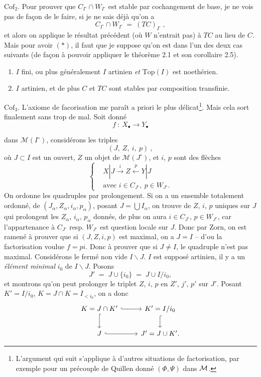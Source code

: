 $\mathrm{Cof}_2$. Pour prouver que $C_{I^\circ} \cap W_{I^\circ}$ est stable par cochangement de base, je ne vois pas de façon de le faire, si je ne sais déjà qu'on a
\[ C_{I^\circ} \cap W_{I^\circ} \ = \ (TC)_{I^\circ}\ , \tag*{$(*)$} \]
et alors on applique le résultat précédent (où $W$ n'entrait pas) à $TC$ au lieu de $C$. Mais pour avoir $(*)$, il faut que je suppose qu'on est dans l'un des deux cas suivants (de façon à pouvoir appliquer le théorème 2.1 et son corollaire 2.5).
\begin{enumerate}[leftmargin=2.5em]
\item[a)] $I$ fini, ou plus généralement $I$ artinien \textit{et} $\mathrm{Top}(I)$ est noethérien.
\item[b)] $I$ artinien, et de plus $C$ et $TC$ sont stables par composition transfinie.
\end{enumerate}
$\mathrm{Cof}_3$. L'axiome de facorisation me paraît a priori le plus délicat\footnote[15]{L'argument qui suit s'applique à d'autres situations de factorisation, par exemple pour un précouple de Quillen donné $(\Phi, \Psi)$ dans $\mathcal{M}$.}. Mais cela sort finalement sans trop de mal. Soit donné %
\[ f \ : \ X_\bullet \longrightarrow Y_\bullet \]


dans $\mathcal{M}(I^\circ)$, considérons les triples
\[
(J,\ Z,\ i,\ p)\ ,
\]
où $J\subset I$ est un ouvert, $Z$ un objet de $\mathcal{M}(J^\circ)$, et $i$, $p$ sont des flèches
\[
\left\{
\begin{aligned}
& X|J \xrightarrow{\ i\ } Z \xleftarrow{\ p\ } Y|J \\
& \text{avec } i\in C_{J^\circ},\ p\in W_{J^\circ}.
\end{aligned}
\right.
\]
On ordonne les quadruples par prolongement. Si on a un ensemble totalement ordonné, de $(J_\alpha,Z_\alpha,i_\alpha,p_\alpha)$, posant $J=\bigcup I_\alpha$, on trouve de $Z$, $i$, $p$ uniques sur $J$ qui prolongent %
les $Z_\alpha$, $i_\alpha$, $p_\alpha$ donnés, de plus on aura $i\in C_{J^\circ}$, $p\in W_{J^\circ}$, car l'appartenance à $C_{J^\circ}$ resp. $W_{J^\circ}$ est question locale sur $J$. Donc par Zorn, on est ramené à prouver que si $(J,Z,i,p)$ est maximal, on a $J=I$ – d'ou la factorisation voulue $f=pi$. Donc à prouver que si %
$J\neq I$, le quadruple n'est pas maximal. Considérons le fermé non vide $I\backslash J$. $I$ est supposé artinien, il y a un \textit{élément minimal} $i_0$ de $I\backslash J$. Posons
\[
J' \;=\; J\cup\{i_0\} \;=\; J\cup I/i_0,
\]
et montrons qu'on peut prolonger le triplet $Z$, $i$, $p$ en $Z'$, $j'$, $p'$ sur $J'$. Posant $K'=I/i_0$, %
$K=J\cap K=I_{<i_0}$, on a donc %
\[
\begin{tikzcd}
K=J\cap K' \arrow[r, hook] \arrow[d, hook] & K'=I/i_0 \arrow[d, hook] \\
J \arrow[r, hook] & J'=J\cup K'.
\end{tikzcd}
\]

